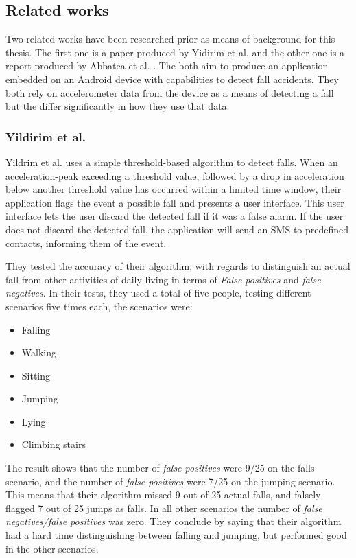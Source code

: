 \documentclass[12pt, a4paper, onecolumn]{article}
\begin{document}
	
	\subsection{Related works} Two related works have been researched prior as means of background for this thesis. The first one is a paper produced by Yidirim et al. \cite{int_journ} and the other one is a report produced by Abbatea et al. \cite{piza_uni}. The both aim to produce an application embedded on an Android device with capabilities to detect fall accidents. They both rely on accelerometer data from the device as a means of detecting a fall but the differ significantly in how they use that data. 
	
	\subsubsection{Yildirim et al.}
	Yildrim et al. \cite{int_journ} uses a simple threshold-based algorithm to detect falls. When an acceleration-peak exceeding a threshold value, followed by a drop in acceleration below another threshold value has occurred within a limited time window, their application flags the event a possible fall and presents a user interface. This user interface lets the user discard the detected fall if it was a false alarm. If the user does not discard the detected fall, the application will send an SMS to predefined contacts, informing them of the event. 
	
	They tested the accuracy of their algorithm, with regards to distinguish an actual fall from other activities of daily living in terms of \textit{False positives} and \textit{false negatives}. In their tests, they used a total of five people, testing different scenarios five times each, the scenarios were:
	
	\begin{itemize}
		\item Falling
		\item Walking
		\item Sitting
		\item Jumping
		\item Lying
		\item Climbing stairs
	\end{itemize}
	
	The result shows that the number of \textit{false positives} were 9/25 on the falls scenario, and the number of \textit{false positives} were 7/25 on the jumping scenario. This means that their algorithm missed 9 out of 25 actual falls, and falsely flagged 7 out of 25 jumps as falls. In all other scenarios the number of \textit{false negatives/false positives} was zero. They conclude by saying that their algorithm had a hard time distinguishing between falling and jumping, but performed good in the other scenarios. 
	
\end{document}
